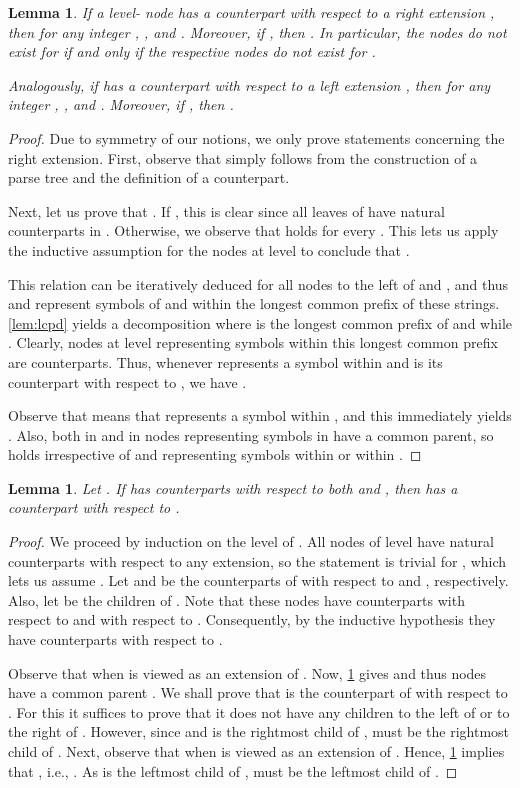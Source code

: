\documentclass[a4paper]{article}
\newtheorem{lemma}[theorem]{Lemma}
\theoremstyle{remark}
\begin{document}
\begin{lemma}\label{lem:close}
If a level- node  has a counterpart  with respect to a right extension ,
then  for any integer , , and .
Moreover, if , then .
In particular, the nodes do not exist for  if and only if the respective nodes do not exist for .


Analogously, if  has a counterpart  with respect to a left extension  ,
then  for any integer , , and .
Moreover, if , then .
\end{lemma}

\begin{proof}
Due to symmetry of our notions, we only prove statements concerning the right extension.
First, observe that  simply follows from the construction
of a parse tree and the definition of a counterpart.

Next, let us prove that . If , this is clear since
all leaves of  have natural counterparts in .
Otherwise, we observe that  holds for every .
This lets us apply the inductive assumption
for the nodes  at level  to conclude that .

This relation can be iteratively deduced for all nodes to the left of  and ,
and thus  and  represent symbols of  and  within the longest
common prefix  of these strings.
\cref{lem:lcpd} yields a decomposition  where  is the longest common prefix of 
and  while . Clearly, nodes at level  representing symbols within this longest
common prefix are counterparts.
Thus, whenever  represents a symbol within  and  is its counterpart with respect to ,
we have .

Observe that  means that  represents a symbol within , and this immediately
yields .
Also, both in  and in  nodes representing symbols in  have a common parent, so
 holds irrespective of  and  representing symbols within  or within .
\end{proof}

\begin{lemma}\label{lem:lr}
Let . If  has counterparts with respect to both  and , then 
has a counterpart with respect to .
\end{lemma}
\begin{proof}
We proceed by induction on the level  of . All nodes of level  have natural counterparts with respect to any extension,
so the statement is trivial  for , which lets us assume .
Let  and  be the counterparts of  with respect to  and , respectively.
Also, let  be the children of .
Note that these nodes have counterparts  with respect to  and
 with respect to .
Consequently, by the inductive hypothesis they have counterparts  with respect to .

Observe that  when  is viewed as an extension  of .
Now, \cref{lem:close} gives 
and thus nodes  have a common parent . We shall prove
that  is the counterpart of  with respect to . For this it suffices to prove
that it does not have any children to the left of  or to the right of .
However, since  and  is the rightmost child of ,
 must be the rightmost child of .
Next, observe that  when  is viewed as an extension  of .
Hence, \cref{lem:close} implies that ,
i.e., . As  is the leftmost child of ,  must be the leftmost child of .
\end{proof}
\end{document}
